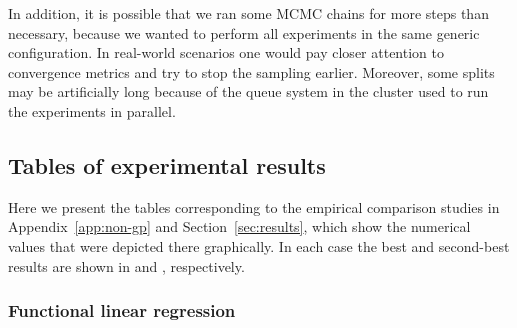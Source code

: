 In addition, it is possible that we ran some MCMC chains for more steps than necessary, because we wanted to perform all experiments in the same generic configuration. In real-world scenarios one would pay closer attention to convergence metrics and try to stop the sampling earlier. Moreover, some splits may be artificially long because of the queue system in the cluster used to run the experiments in parallel.


\subsection{Tables of experimental results}\label{app:tables}

Here we present the tables corresponding to the empirical comparison studies in Appendix~\ref{app:non-gp} and Section~\ref{sec:results}, which show the numerical values that were depicted there graphically. In each case the best and second-best results are shown in  and , respectively.


\newpage
\subsubsection*{Functional linear regression}

